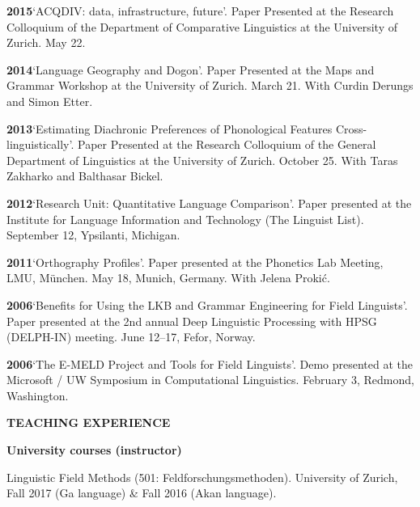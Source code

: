 \documentclass[11pt]{article}
\newcommand{\hangpara}{
 \setlength{\parindent}{0in} %
 \hangindent=0.42in %
}
\begin{document}
\vskip 6pt
\hangpara
{\bf 2015}\hspace{1ex}`ACQDIV: data, infrastructure, future'. Paper Presented at the Research Colloquium of the Department of Comparative Linguistics at the University of Zurich. May 22.

\vskip 6pt
\hangpara
{\bf 2014}\hspace{1ex}`Language Geography and Dogon'. Paper Presented at the Maps and Grammar Workshop at the University of Zurich. March 21. With Curdin Derungs and Simon Etter.

\vskip 6pt
\hangpara
{\bf 2013}\hspace{1ex}`Estimating Diachronic Preferences of Phonological Features Cross-linguistically'. Paper Presented at the Research Colloquium of the General Department of Linguistics at the University of Zurich. October 25. With Taras Zakharko and Balthasar Bickel.

\vskip 6pt
\hangpara
{\bf 2012}\hspace{1ex}`Research Unit: Quantitative Language Comparison'. Paper presented at the Institute for Language Information and Technology (The Linguist List). September 12, Ypsilanti, Michigan.

\vskip 6pt
\hangpara
{\bf 2011}\hspace{1ex}`Orthography Profiles'. Paper presented at the Phonetics Lab Meeting, LMU, M{\"u}nchen. May 18, Munich, Germany. With Jelena Proki{\'c}.

\vskip 6pt
\hangpara
{\bf 2006}\hspace{1ex}`Benefits for Using the LKB and Grammar Engineering for Field Linguists'. Paper presented at the 2nd annual Deep Linguistic Processing with HPSG (DELPH-IN) meeting. June 12--17, Fefor, Norway.

\vskip 6pt
\hangpara
{\bf 2006}\hspace{1ex}`The E-MELD Project and Tools for Field Linguists'. Demo presented at the Microsoft / UW Symposium in Computational Linguistics. February 3, Redmond, Washington.


\vskip 20pt
\begin{flushleft}
{\bf TEACHING EXPERIENCE}
\end{flushleft}

\begin{flushleft}
{\bf University courses (instructor)}
\end{flushleft}

\hangpara Linguistic Field Methods (501: Feldforschungsmethoden). University of Zurich, Fall 2017 (Ga language) \& Fall 2016 (Akan language).
\end{document}
